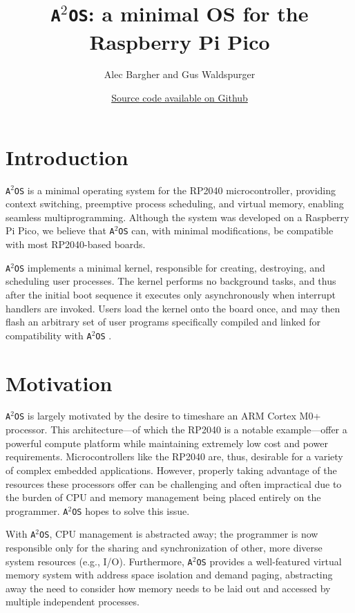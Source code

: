 \documentclass[12pt]{article}
\title{\texttt{A$^2$OS}: a minimal OS for the Raspberry Pi Pico}
\author{Alec Bargher and Gus Waldspurger}
\date{\href{https://github.com/abargher/asquaredos}{Source code available on Github}}
\newcommand{\os}{\texttt{A$^2$OS} }
\newcommand{\osns}{\texttt{A$^2$OS}}
\begin{document}
\maketitle

\section{Introduction}
\os is a minimal operating system for the RP2040 microcontroller, providing
context switching, preemptive process scheduling, and virtual memory, enabling
seamless multiprogramming. Although the system was developed on a Raspberry Pi
Pico, we believe that \os can, with minimal modifications, be compatible with
most RP2040-based boards.

\vspace{.5em}

\os implements a minimal kernel, responsible for creating, destroying, and
scheduling user processes. The kernel performs no background tasks, and thus
after the initial boot sequence it executes only asynchronously when interrupt
handlers are invoked. Users load the kernel onto the board once, and may then
flash an arbitrary set of user programs specifically compiled and linked for
compatibility with \os.

\section{Motivation}

\os is largely motivated by the desire to timeshare an ARM Cortex M0+ processor.
This architecture---of which the RP2040 is a notable example---offer a powerful
compute platform while maintaining extremely low cost and power requirements.
Microcontrollers like the RP2040 are, thus, desirable for a variety of complex
embedded applications. However, properly taking advantage of the resources these
processors offer can be challenging and often impractical due to the burden of
CPU and memory management being placed entirely on the programmer. \os hopes to
solve this issue.

With \osns, CPU management is abstracted away; the programmer is now responsible
only for the sharing and synchronization of other, more diverse system
resources (e.g., I/O). Furthermore, \os provides a well-featured virtual memory
system with address space isolation and demand paging, abstracting away the need
to consider how memory needs to be laid out and accessed by multiple independent
processes.
\end{document}
